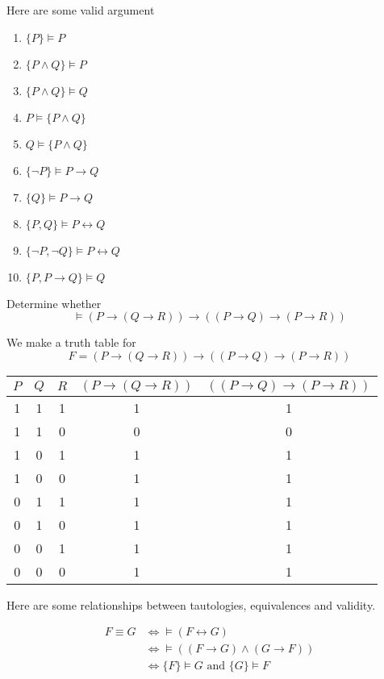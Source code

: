 Here are some valid argument 

\begin{enumerate}
\item $\{P\} \vDash P$
\item $\{P\wedge Q \} \vDash P$
\item $\{P\wedge Q \} \vDash Q$
\item $P \vDash \{P\wedge Q \}$
\item $Q \vDash \{P\wedge Q \}$
\item $\{\neg P\}\vDash P\to Q$
\item $\{Q\}\vDash P\to Q$
\item $\{P,Q\}\vDash P\leftrightarrow Q$
\item $\{\neg P,\neg Q\}\vDash P\leftrightarrow Q$
\item $\{P, P\to Q\}\vDash Q$
\end{enumerate}


\begin{exmp}
Determine whether $$\vDash (P\to (Q\to R))\to ((P\to Q) \to (P\to R))$$
\end{exmp}

\begin{solution}
We make a truth table for $$F = (P\to (Q\to R))\to ((P\to Q) \to (P\to R))$$

\begin{center}
\begin{tabular}{c|c|c|c|c}
     $P$ & $Q$ & $R$ & $(P\to (Q\to R))$ &  $((P\to Q) \to (P\to R))$\\\hline
     1 & 1 & 1 & 1 & 1 \\\hline
     1 & 1 & 0 & 0 & 0 \\\hline
     1 & 0 & 1 & 1 & 1 \\\hline
     1 & 0 & 0 & 1 & 1 \\\hline
     0 & 1 & 1 & 1 & 1 \\\hline
     0 & 1 & 0 & 1 & 1 \\\hline
     0 & 0 & 1 & 1 & 1 \\\hline
     0 & 0 & 0 & 1 & 1 
     
\end{tabular}
\end{center}
\end{solution}

Here are some relationships between tautologies, equivalences and validity.

\begin{align*}
    F\equiv G &\Leftrightarrow  \vDash (F\leftrightarrow G)\\
    &\Leftrightarrow  \vDash ((F\to G)\wedge (G\to F)) \\
    &\Leftrightarrow  \{F\} \vDash G \text{ and }\{G\} \vDash F \\
\end{align*}


